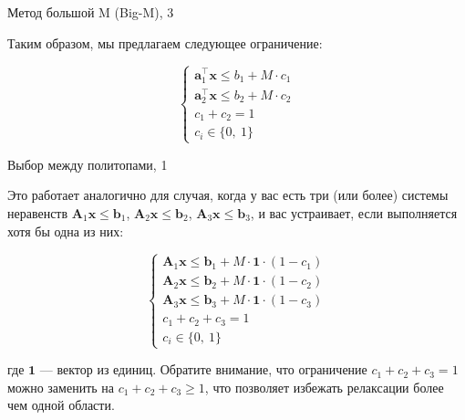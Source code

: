 \documentclass{beamer}
\begin{document}
	
	\begin{frame}{Метод большой M (Big-M), 3}
		\begin{flushleft}
			
			Таким образом, мы предлагаем следующее ограничение:
			
			\begin{equation}
				\begin{cases}
					\mathbf{a}_1^\top \mathbf{x} \leq b_1 + M \cdot c_1 \\
					\mathbf{a}_2^\top \mathbf{x} \leq b_2 + M \cdot c_2 \\
					c_1 + c_2 = 1  \\
					c_i  \in \{0, \ 1 \}
				\end{cases}
			\end{equation}
			
			
			\begin{figure} [h!]
				\begin{center}
					
				\end{center} 
			\end{figure}
			
		\end{flushleft}
	\end{frame}
	
	
	
	
	\begin{frame}{Выбор между политопами, 1}
		\begin{flushleft}
			
			Это работает аналогично для случая, когда у вас есть три (или более) системы неравенств $\mathbf{A}_1 \mathbf{x} \leq \mathbf{b}_1$, $\mathbf{A}_2 \mathbf{x} \leq \mathbf{b}_2$, $\mathbf{A}_3 \mathbf{x} \leq \mathbf{b}_3$, и вас устраивает, если выполняется хотя бы одна из них:
			
			\begin{equation}
				\begin{cases}
					\mathbf{A}_1 \mathbf{x} \leq \mathbf{b}_1 + M \cdot \mathbf{1} \cdot (1 - c_1) \\
					\mathbf{A}_2 \mathbf{x} \leq \mathbf{b}_2 + M \cdot \mathbf{1} \cdot (1 - c_2) \\
					\mathbf{A}_3 \mathbf{x} \leq \mathbf{b}_3 + M \cdot \mathbf{1} \cdot (1 - c_3) \\
					c_1 + c_2 + c_3 = 1 \\
					c_i  \in \{0, \ 1 \}
				\end{cases}
			\end{equation}
			
			где $\mathbf{1}$ — вектор из единиц. Обратите внимание, что ограничение $c_1 + c_2 + c_3 = 1$ можно заменить на $c_1 + c_2 + c_3 \geq 1$, что позволяет избежать релаксации более чем одной области.
			
		\end{flushleft}
	\end{frame}
	
\end{document}
